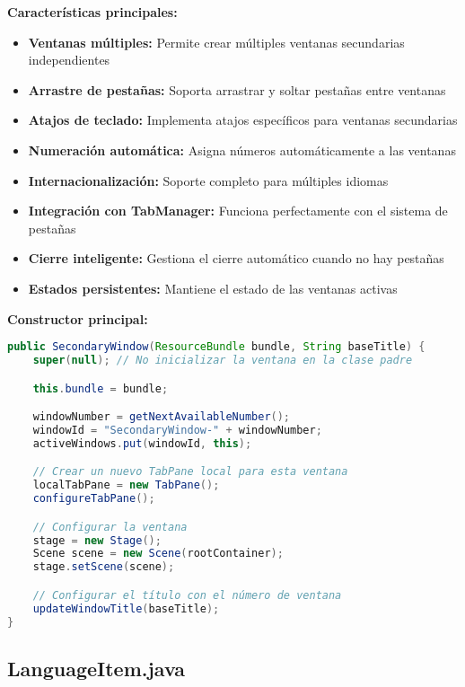 \inputminted[linenos,breaklines,firstline=1,lastline=150]{java}{codigo/src/utils/SecondaryWindow.java}

\textbf{Características principales:}

\begin{itemize}
    \item \textbf{Ventanas múltiples:} Permite crear múltiples ventanas secundarias independientes
    \item \textbf{Arrastre de pestañas:} Soporta arrastrar y soltar pestañas entre ventanas
    \item \textbf{Atajos de teclado:} Implementa atajos específicos para ventanas secundarias
    \item \textbf{Numeración automática:} Asigna números automáticamente a las ventanas
    \item \textbf{Internacionalización:} Soporte completo para múltiples idiomas
    \item \textbf{Integración con TabManager:} Funciona perfectamente con el sistema de pestañas
    \item \textbf{Cierre inteligente:} Gestiona el cierre automático cuando no hay pestañas
    \item \textbf{Estados persistentes:} Mantiene el estado de las ventanas activas
\end{itemize}

\textbf{Constructor principal:}

\begin{lstlisting}[language=Java, caption=Constructor de SecondaryWindow]
public SecondaryWindow(ResourceBundle bundle, String baseTitle) {
    super(null); // No inicializar la ventana en la clase padre

    this.bundle = bundle;

    windowNumber = getNextAvailableNumber();
    windowId = "SecondaryWindow-" + windowNumber;
    activeWindows.put(windowId, this);

    // Crear un nuevo TabPane local para esta ventana
    localTabPane = new TabPane();
    configureTabPane();

    // Configurar la ventana
    stage = new Stage();
    Scene scene = new Scene(rootContainer);
    stage.setScene(scene);

    // Configurar el título con el número de ventana
    updateWindowTitle(baseTitle);
}
\end{lstlisting}

\subsection{LanguageItem.java}

